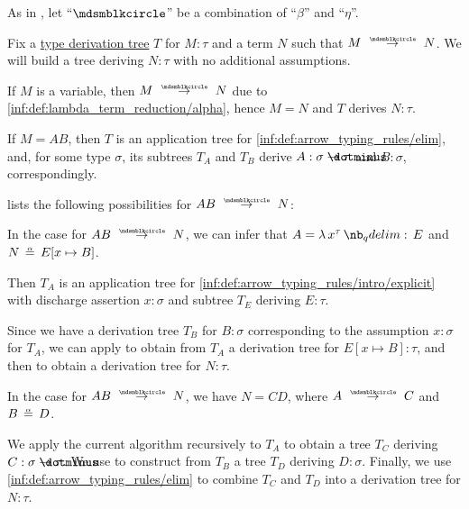 \begin{algorithm}\label{alg:simply_typed_reduction}
  As in , let \enquote{\( {\Anon} \)} be a combination of \enquote{\( \beta \)} and \enquote{\( \eta \)}.

  Fix a \hyperref[def:type_derivation_tree]{type derivation tree} \( T \) for \( M: \tau \) and a term \( N \) such that \( M \pred N \). We will build a tree deriving \( N: \tau \) with no additional assumptions.

  \begin{thmenum}
     If \( M \) is a variable, then \( M \pred N \) due to \ref{inf:def:lambda_term_reduction/alpha}, hence \( M = N \) and \( T \) derives \( N: \tau \).

     If \( M = AB \), then \( T \) is an application tree for \ref{inf:def:arrow_typing_rules/elim}, and, for some type \( \sigma \), its subtrees \( T_A \) and \( T_B \) derive \( A: \sigma \synimplies \tau \) and \( B: \sigma \), correspondingly.

     lists the following possibilities for \( A B \pred N \):
    \begin{thmenum}
       In the case  for \( A B \pred N \), we can infer that \( A = \qabs {x^\tau} E \) and \( N \aequiv E[x \mapsto B] \).

      Then \( T_A \) is an application tree for \ref{inf:def:arrow_typing_rules/intro/explicit} with discharge assertion \( x: \sigma \) and subtree \( T_E \) deriving \( E: \tau \).

      Since we have a derivation tree \( T_B \) for \( B: \sigma \) corresponding to the assumption \( x: \sigma \) for \( T_A \), we can apply  to obtain from \( T_A \) a derivation tree for \( E[x \mapsto B]: \tau \), and then  to obtain a derivation tree for \( N: \tau \).

       In the case  for \( A B \pred N \), we have \( N = CD \), where \( A \pred C \) and \( B \aequiv D \).

      We apply the current algorithm recursively to \( T_A \) to obtain a tree \( T_C \) deriving \( C: \sigma \synimplies \tau \). We use  to construct from \( T_B \) a tree \( T_D \) deriving \( D: \sigma \). Finally, we use \ref{inf:def:arrow_typing_rules/elim} to combine \( T_C \) and \( T_D \) into a derivation tree for \( N: \tau \).


\end{thmenum}
\end{thmenum}
\end{algorithm}
